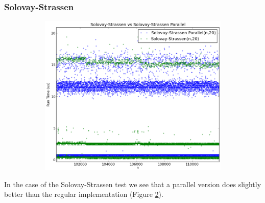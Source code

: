 \documentclass[compressed,final,notitlepage,narroweqnarray,inline,twoside,]{ieee}
\begin{document}
\subsubsection{Solovay-Strassen}
\begin{figure}
        \centering
        \begin{subfigure}[b]{0.525\textwidth}
                \includegraphics[width=\textwidth]{../images/SS_SSP_runtime}
                \label{fig:gull}
        \end{subfigure}
        \vspace{-30pt}\caption{}\label{fig:ss_p_comparison_small}
\end{figure}
In the case of the Solovay-Strassen test we see that a parallel version does slightly better than the regular implementation (Figure \ref{fig:ss_p_comparison_small}).
\end{document}
